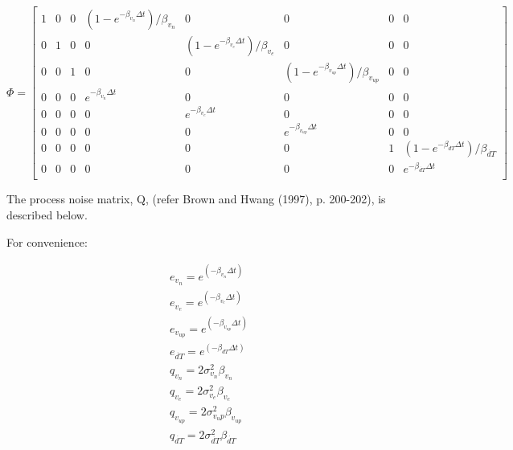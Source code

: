 \documentclass[11pt,letterpaper]{article}
\begin{document}
\begin{equation} \label{eq:T}
\Phi = \left[
\begin{array}{cccccccc}
1 & 0 & 0 & (1-e^{-\beta_{v_n} \Delta t})/\beta_{v_n} & 0 & 0 & 0 & 0 \\
0 & 1 & 0 & 0 & (1-e^{-\beta_{v_e} \Delta t})/\beta_{v_e} & 0 & 0 & 0 \\
0 & 0 & 1 & 0 & 0 & (1-e^{-\beta_{v_{up}} \Delta t})/\beta_{v_{up}} & 0 & 0 \\
0 & 0 & 0 & e^{-\beta_{v_n} \Delta t} & 0 & 0 & 0 & 0 \\
0 & 0 & 0 & 0 & e^{-\beta_{v_e} \Delta t} & 0 & 0 & 0 \\
0 & 0 & 0 & 0 & 0 & e^{-\beta_{v_{up}} \Delta t} & 0 & 0 \\
0 & 0 & 0 & 0 & 0 & 0 & 1 & (1-e^{-\beta_{\dot{dT}} \Delta t})/\beta_{\dot{dT}} \\
0 & 0 & 0 & 0 & 0 & 0 & 0 & e^{-\beta_{\dot{dT}} \Delta t} \\
\end{array}
\right]
\end{equation}

The process noise matrix, Q, (refer Brown and Hwang (1997), p. 200-202), is described below.

For convenience:

\begin{equation} \label{eq:conv}
\begin{array}{l}
e_{v_n}       = e^{( -\beta_{v_n}      \Delta t )} \\
e_{v_e}       = e^{( -\beta_{v_e}      \Delta t )} \\
e_{v_{up}}    = e^{( -\beta_{v_{up}}   \Delta t )} \\
e_{\dot{dT}}  = e^{( -\beta_{\dot{dT}} \Delta t )} \\
q_{v_n}       = 2 \sigma_{v_n}^2 \beta_{v_n} \\
q_{v_e}       = 2 \sigma_{v_e}^2 \beta_{v_e} \\
q_{v_{up}}    = 2 \sigma_{v_up}^2 \beta_{v_{up}} \\
q_{\dot{dT}}  = 2 \sigma_{\dot{dT}}^2 \beta_{\dot{dT}} \\
\end{array}
\end{equation}
\end{document}
